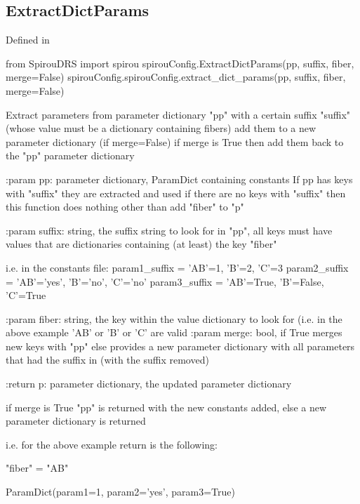 \begin{minipage}{\textwidth}
\subsection{ExtractDictParams}

Defined in \spirouConfig{}

\begin{pythonbox}
from SpirouDRS import spirou
spirouConfig.ExtractDictParams(pp, suffix, fiber, merge=False)
spirouConfig.spirouConfig.extract_dict_params(pp, suffix, fiber, merge=False)
\end{pythonbox}

\begin{pythondocstring}
Extract parameters from parameter dictionary "pp" with a certain suffix
"suffix" (whose value must be a dictionary containing fibers) add them
to a new parameter dictionary (if merge=False) if merge is True then
add them back to the "pp" parameter dictionary

:param pp: parameter dictionary, ParamDict containing constants
            If pp has keys with "suffix" they are extracted and used
            if there are no keys with "suffix" then this function does
            nothing other than add "fiber" to "p"

:param suffix: string, the suffix string to look for in "pp", all keys
               must have values that are dictionaries containing (at least)
               the key "fiber"

               i.e. in the constants file:
               param1_suffix = {'AB'=1, 'B'=2, 'C'=3}
               param2_suffix = {'AB'='yes', 'B'='no', 'C'='no'}
               param3_suffix = {'AB'=True, 'B'=False, 'C'=True}

:param fiber: string, the key within the value dictionary to look for
              (i.e. in the above example 'AB' or 'B' or 'C' are valid
:param merge: bool, if True merges new keys with "pp" else provides
              a new parameter dictionary with all parameters that had the
              suffix in (with the suffix removed)

:return p: parameter dictionary, the updated parameter dictionary

           if merge is True "pp" is returned with the new constants
           added, else a new parameter dictionary is returned

            i.e. for the above example return is the following:

                "fiber" = "AB"

           ParamDict(param1=1, param2='yes', param3=True)
\end{pythondocstring}
\end{minipage}

